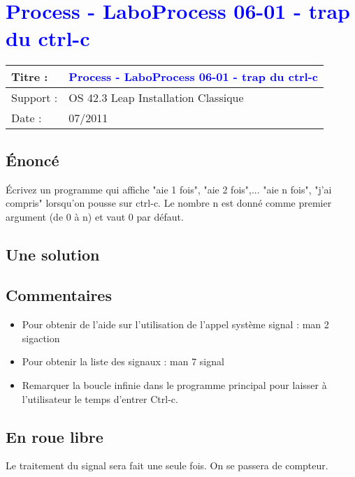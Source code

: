 \lstset{language=c}
\renewcommand{\titre}{\textcolor{blue}{ Process - LaboProcess 06-01 - trap du ctrl-c }}

\lhead{ \titre }
\section{{\titre} }

\begin{tabular}{|l|l|}
\hline
Titre : 	& \titre \\\hline
Support : 	& OS 42.3 Leap Installation Classique \\\hline
Date :		& 07/2011 \\\hline
\end{tabular}

\subsection{Énoncé}

Écrivez un programme qui affiche "aie 1 fois", "aie 2 fois",... "aie n fois", "j'ai compris" lorsqu'on pousse sur ctrl-c. Le nombre n est donné comme premier argument (de 0 à n) et vaut 0 par défaut.

\subsection{Une solution}



\subsection{Commentaires}

\begin{itemize}
\item Pour obtenir de l'aide sur l'utilisation de l'appel système signal : man 2 sigaction
\item Pour obtenir la liste des signaux : man 7 signal
\item Remarquer la boucle infinie dans le programme principal pour laisser à l'utilisateur le temps d'entrer Ctrl-c.
\end{itemize}
\subsection{En roue libre}
Le traitement du signal sera fait une seule fois. On se passera de compteur. 
\newpage

